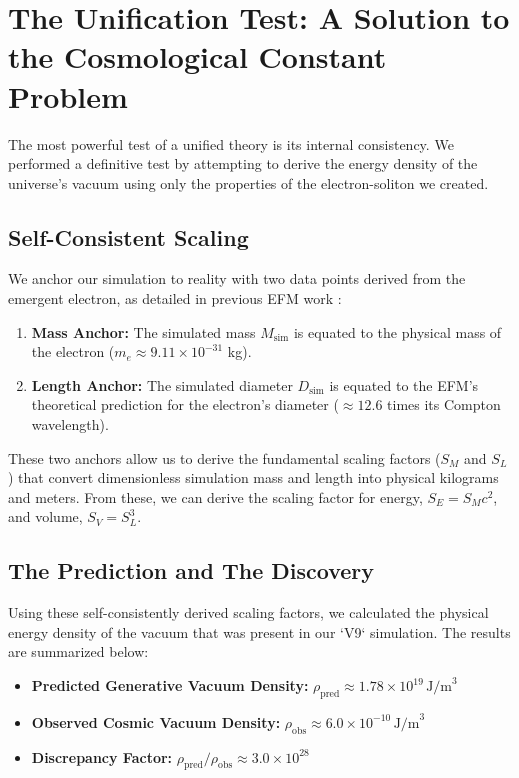 \documentclass[11pt, twoside]{article}
\begin{document}
\section{The Unification Test: A Solution to the Cosmological Constant Problem}
The most powerful test of a unified theory is its internal consistency. We performed a definitive test by attempting to derive the energy density of the universe's vacuum using only the properties of the electron-soliton we created.

\subsection{Self-Consistent Scaling}
We anchor our simulation to reality with two data points derived from the emergent electron, as detailed in previous EFM work \citep{EFMmassgen}:
\begin{enumerate}
    \item \textbf{Mass Anchor:} The simulated mass \(M_{\text{sim}}\) is equated to the physical mass of the electron (\(m_e \approx 9.11 \times 10^{-31}\) kg).
    \item \textbf{Length Anchor:} The simulated diameter \(D_{\text{sim}}\) is equated to the EFM's theoretical prediction for the electron's diameter (\(\approx 12.6\) times its Compton wavelength).
\end{enumerate}
These two anchors allow us to derive the fundamental scaling factors (\(S_M\) and \(S_L\)) that convert dimensionless simulation mass and length into physical kilograms and meters. From these, we can derive the scaling factor for energy, \(S_E = S_M c^2\), and volume, \(S_V = S_L^3\).

\subsection{The Prediction and The Discovery}
Using these self-consistently derived scaling factors, we calculated the physical energy density of the vacuum that was present in our `V9` simulation. The results are summarized below:
\begin{itemize}
    \item \textbf{Predicted Generative Vacuum Density:} \(\rho_{\text{pred}} \approx 1.78 \times 10^{19} \, \text{J/m}^3\)
    \item \textbf{Observed Cosmic Vacuum Density:} \(\rho_{\text{obs}} \approx 6.0 \times 10^{-10} \, \text{J/m}^3\)
    \item \textbf{Discrepancy Factor:} \(\rho_{\text{pred}} / \rho_{\text{obs}} \approx 3.0 \times 10^{28}\)
\end{itemize}
\end{document}
